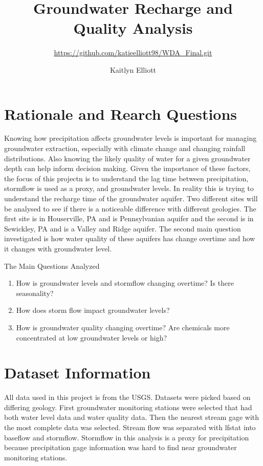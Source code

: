 \documentclass[
  12pt,
]{article}
\title{Groundwater Recharge and Quality Analysis}
\subtitle{\url{https://github.com/katieelliott98/WDA_Final.git}}
\author{Kaitlyn Elliott}
\date{}
\providecommand{\tightlist}{%
  \setlength{\itemsep}{0pt}\setlength{\parskip}{0pt}}
\begin{document}
\maketitle

\newpage
\tableofcontents
\newpage

\hypertarget{rationale-and-rearch-questions}{%
\section{Rationale and Rearch
Questions}\label{rationale-and-rearch-questions}}

Knowing how precipitation affects groundwater levels is important for
managing groundwater extraction, especially with climate change and
changing rainfall distributions. Also knowing the likely quality of
water for a given groundwater depth can help inform decision making.
Given the importance of these factors, the focus of this projectn is to
understand the lag time between precipitation, stormflow is used as a
proxy, and groundwater levels. In reality this is trying to understand
the recharge time of the groundwater aquifer. Two different sites will
be analysed to see if there is a noticeable difference with different
geologies. The first site is in Houserville, PA and is Pennsylvanian
aquifer and the second is in Sewickley, PA and is a Valley and Ridge
aquifer. The second main question investigated is how water quality of
these aquifers has change overtime and how it changes with groundwater
level.

The Main Questions Analyzed

\begin{enumerate}
\def\labelenumi{\arabic{enumi}.}
\tightlist
\item
  How is groundwater levels and stormflow changing overtime? Is there
  seasonality?
\item
  How does storm flow impact groundwater levels?
\item
  How is groundwater quality changing overtime? Are chemicals more
  concentrated at low groundwater levels or high?
\end{enumerate}

\newpage

\hypertarget{dataset-information}{%
\section{Dataset Information}\label{dataset-information}}

All data used in this project is from the USGS. Datasets were picked
based on differing geology. First groundwater monitoring stations were
selected that had both water level data and water quality data. Then the
nearest stream gage with the most complete data was selected. Stream
flow was separated with lfstat into baseflow and stormflow. Stormflow in
this analysis is a proxy for precipitation because precipitation gage
information was hard to find near groundwater monitoring stations.
\end{document}
